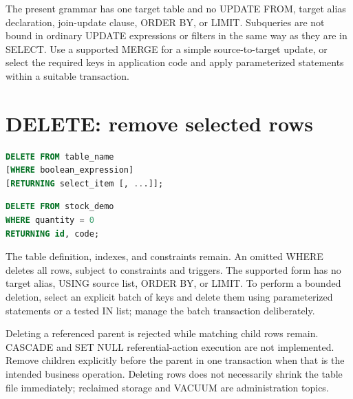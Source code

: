 The present grammar has one target table and no UPDATE FROM, target alias declaration, join-update clause, ORDER BY, or LIMIT. Subqueries are not bound in ordinary UPDATE expressions or filters in the same way as they are in SELECT. Use a supported MERGE for a simple source-to-target update, or select the required keys in application code and apply parameterized statements within a suitable transaction.



\section{DELETE: remove selected rows}

\begin{lstlisting}[language=SQL]
DELETE FROM table_name
[WHERE boolean_expression]
[RETURNING select_item [, ...]];
\end{lstlisting}

\begin{lstlisting}[language=SQL]
DELETE FROM stock_demo
WHERE quantity = 0
RETURNING id, code;
\end{lstlisting}

The table definition, indexes, and constraints remain. An omitted WHERE deletes all rows, subject to constraints and triggers. The supported form has no target alias, USING source list, ORDER BY, or LIMIT. To perform a bounded deletion, select an explicit batch of keys and delete them using parameterized statements or a tested IN list; manage the batch transaction deliberately.

Deleting a referenced parent is rejected while matching child rows remain. CASCADE and SET NULL referential-action execution are not implemented. Remove children explicitly before the parent in one transaction when that is the intended business operation. Deleting rows does not necessarily shrink the table file immediately; reclaimed storage and VACUUM are administration topics.

